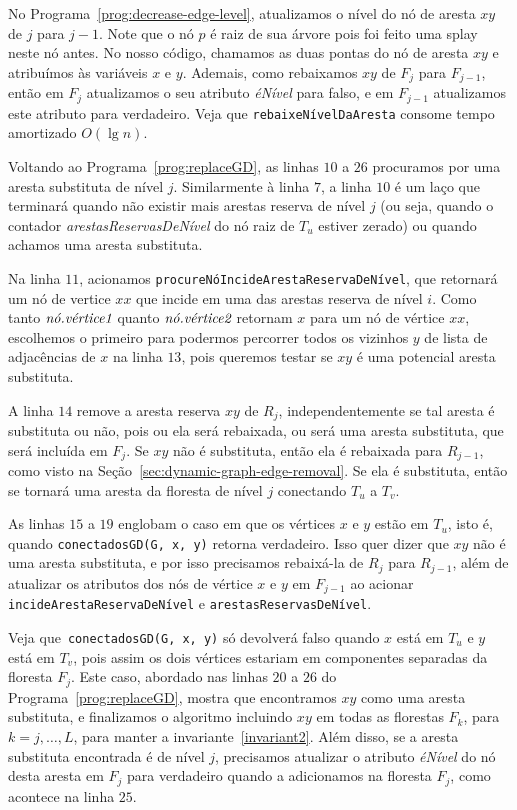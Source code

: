 No Programa~\ref{prog:decrease-edge-level}, atualizamos o nível do nó de aresta $xy$ de $j$ para $j-1$. Note que o nó $p$ é raiz de sua árvore pois foi feito uma splay neste nó antes. No nosso código, chamamos as duas pontas do nó de aresta $xy$ e atribuímos às variáveis $x$ e $y$. Ademais, como rebaixamos $xy$ de $F_j$ para $F_{j - 1}$, então em $F_j$ atualizamos o seu atributo \textit{éNível} para falso, e em $F_{j-1}$ atualizamos este atributo para verdadeiro. Veja que \texttt{rebaixeNívelDaAresta} consome tempo amortizado $O(\lg n)$.

Voltando ao Programa~\ref{prog:replaceGD}, as linhas $10$ a $26$ procuramos por uma aresta substituta de nível $j$. Similarmente à linha $7$, a linha $10$ é um laço que terminará quando não existir mais arestas reserva de nível $j$ (ou seja, quando o contador \textit{arestasReservasDeNível} do nó raiz de $T_u$ estiver zerado) ou quando achamos uma aresta substituta.  

Na linha $11$, acionamos \texttt{procureNóIncideArestaReservaDeNível}, que retornará um nó de vertice $xx$ que incide em uma das arestas reserva de nível $i$. Como tanto $\emph{nó.vértice1}$ quanto $\emph{nó.vértice2}$ retornam $x$ para um nó de vértice $xx$, escolhemos o primeiro para podermos percorrer todos os vizinhos $y$ de lista de adjacências de $x$ na linha $13$, pois queremos testar se $xy$ é uma potencial aresta substituta.

A linha $14$ remove a aresta reserva $xy$ de $R_j$, independentemente se tal aresta é substituta ou não, pois ou ela será rebaixada, ou será uma aresta substituta, que será incluída em $F_j$. Se $xy$ não é substituta, então ela é rebaixada para $R_{j-1}$, como visto na Seção~\ref{sec:dynamic-graph-edge-removal}. Se ela é substituta, então se tornará uma aresta da floresta de nível $j$ conectando $T_u$ a $T_v$.

As linhas $15$ a $19$ englobam o caso em que os vértices $x$ e $y$ estão em $T_u$, isto é, quando \texttt{conectadosGD(G, x, y)} retorna verdadeiro. Isso quer dizer que $xy$ não é uma aresta substituta, e por isso precisamos rebaixá-la de $R_j$ para $R_{j-1}$, além de atualizar os atributos dos nós de vértice $x$ e $y$ em $F_{j-1}$ ao acionar \texttt{incideArestaReservaDeNível} e \texttt{arestasReservasDeNível}.

Veja que~\texttt{conectadosGD(G, x, y)} só devolverá falso quando $x$ está em $T_u$ e $y$ está em $T_v$, pois assim os dois vértices estariam em componentes separadas da floresta $F_j$. Este caso, abordado nas linhas $20$ a $26$ do Programa~\ref{prog:replaceGD}, mostra que encontramos $xy$ como uma aresta substituta, e finalizamos o algoritmo incluindo $xy$ em todas as florestas $F_k$, para $k = j, \ldots, L$, para manter a invariante~\ref{invariant2}. Além disso, se a aresta substituta encontrada é de nível $j$, precisamos atualizar o atributo \textit{éNível} do nó desta aresta em $F_j$ para verdadeiro quando a adicionamos na floresta $F_j$, como acontece na linha $25$.

